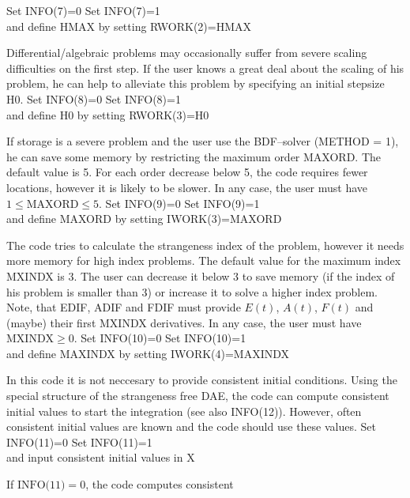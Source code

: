 \begin{description}
  {Set INFO(7)=0}
  {Set INFO(7)=1 \\
    and define HMAX by setting RWORK(2)=HMAX}
\item[INFO(8)] Differential/algebraic problems may occasionally
  suffer from severe scaling difficulties on the first step. If
  the user knows a great deal about the scaling of his problem, he can
  help to alleviate this problem by specifying an initial stepsize
  H0.
  {Set INFO(8)=0}
  {Set INFO(8)=1\\
    and define H0 by setting RWORK(3)=H0}
\item[INFO(9)] If storage is a severe problem and the user use the
  BDF--solver (METHOD = 1), he can save some memory by restricting
  the maximum order MAXORD. The default value is 5. For each order
  decrease below 5, the code requires fewer locations, however it is
  likely to be slower. In any case, the user must have
  $1 \le \mbox{MAXORD} \le 5$.
  {Set INFO(9)=0}
  {Set INFO(9)=1\\
    and define MAXORD by setting IWORK(3)=MAXORD}
\item[INFO(10)] The code tries to calculate the strangeness index of
  the problem, however it needs more memory for high index
  problems. The default value for the maximum index MXINDX is
  3. The user can decrease it below 3 to save memory (if the index of
  his problem is smaller than 3) or increase it to
  solve a higher index problem. Note, that EDIF, ADIF and FDIF
  must provide $E(t)$, $A(t)$, $F(t)$ and (maybe) their first
  MXINDX derivatives. In any case, the user must have $\mbox{MXINDX}
  \ge 0$.
  {Set INFO(10)=0}
  {Set INFO(10)=1\\
    and define MAXINDX by setting IWORK(4)=MAXINDX}
\item[INFO(11)] In this code it is not neccesary to provide consistent
  initial conditions. Using the special structure of the strangeness free
  DAE, the code can compute consistent initial values to start the
  integration (see also INFO(12)). However, often consistent initial
  values are known and the code should use these values.
  {Set INFO(11)=0}
  {Set INFO(11)=1\\
    and input consistent initial values in X}
\item[INFO(12)] If $\mbox{INFO(11)}=0$, the code computes consistent

\end{description}
